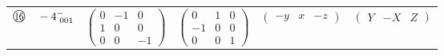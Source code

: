 \documentclass[fleqn,10pt,landscape]{jsarticle}
\begin{document}
\begin{center}
\begin{longtable}{lcccc}
$ {\ooalign{\hfil\resizebox{.8\width}{\height}{16}\hfil\crcr\raise.1ex\hbox{\large$\bigcirc$}}}\quad -4^{-}_{\,\,001} $ & $ \begin{pmatrix} 0 & -1 & 0 \\ 1 & 0 & 0 \\ 0 & 0 & -1 \end{pmatrix} $ & $ \begin{pmatrix} 0 & 1 & 0 \\ -1 & 0 & 0 \\ 0 & 0 & 1 \end{pmatrix} $ & $ \begin{pmatrix} - y & x & - z \end{pmatrix} $ & $ \begin{pmatrix} Y & - X & Z \end{pmatrix} $ \\
\end{longtable}
\end{center}
\newpage
\end{document}
